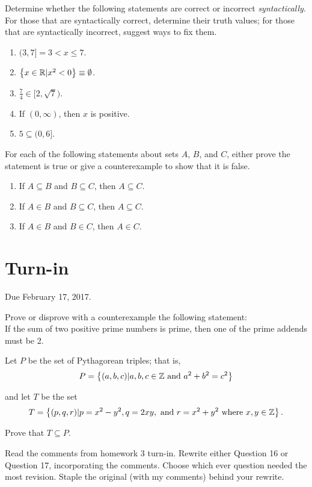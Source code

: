 \documentclass[12pt]{article}
\begin{document}
\begin{qu}
Determine whether the following statements are correct or incorrect \emph{syntactically}. For those that are syntactically correct, determine their truth values; for those that are syntactically incorrect, suggest ways to fix them.
\begin{enumerate}[label=\alph*)]
\item $(3,7]=3<x\leq 7$.
\item $\left\{ x \in \mathbb{R} | x^2<0\right\}\equiv \emptyset $.
\item $\frac{7}{4} \in [2, \sqrt{7})$.
\item If $(0, \infty)$, then $x$ is positive.
\item $5 \subseteq (0, 6]$.
\end{enumerate}
\end{qu}

\begin{qu}
For each of the following statements about sets $A$, $B$, and $C$, either prove the statement is true or give a counterexample to show that it is false.
\begin{enumerate}[label=\alph*)]
\item If $A\subseteq B$ and $B\subseteq C$, then $A \subseteq C$.
\item If $A \in B$ and $B \subseteq C$, then $A \subseteq C$.
\item If $A \in B$ and $B \in C$, then $A \in C$.
\end{enumerate}
\end{qu}

\newpage
\section{Turn-in} 

Due February 17, 2017.



\begin{qu}
Prove or disprove with a counterexample the following statement: \\
If the sum of two positive prime numbers is prime, then one of the prime addends must be 2.
\end{qu}


\begin{qu}
Let $P$ be the set of Pythagorean triples; that is,
$$ P=\left\{ (a,b,c) | a,b,c \in \mathbb{Z} \textrm{ and } a^2+b^2=c^2 \right\} $$

and let $T$ be the set
$$ T = \left\{ (p, q, r) | p=x^2-y^2, q=2xy, \textrm{ and } r=x^2+y^2 \textrm{ where } x, y \in \mathbb{Z} \right\}.$$

Prove that $T \subseteq P$.
\end{qu}

\begin{qu}
Read the comments from homework 3 turn-in. Rewrite either Question 16 or Question 17, incorporating the comments. Choose which ever question needed the most revision. Staple the original (with my comments) behind your rewrite.
\end{qu}
\end{document}

